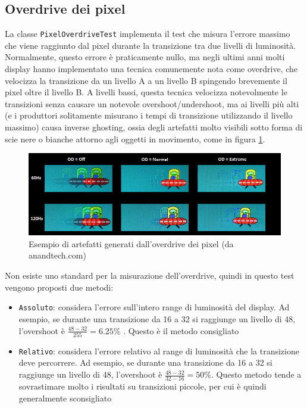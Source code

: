 \subsection{Overdrive dei pixel}
La classe \texttt{PixelOverdriveTest} implementa il test che misura l'errore massimo che viene raggiunto dal pixel durante la transizione tra due livelli di luminosità. Normalmente, questo errore è praticamente nullo, ma negli ultimi anni molti display hanno implementato una tecnica comunemente nota come overdrive, che velocizza la transizione da un livello A a un livello B spingendo brevemente il pixel oltre il livello B. A livelli bassi, questa tecnica velocizza notevolmente le transizioni senza causare un notevole overshoot/undershoot, ma ai livelli più alti (e i produttori solitamente misurano i tempi di transizione utilizzando il livello massimo) causa inverse ghosting, ossia degli artefatti molto visibili sotto forma di scie nere o bianche attorno agli oggetti in movimento, come in figura \ref{fig:overdrive_ufotest}.
\begin{figure}[H]
	\centering
	\includegraphics[width=\textwidth]{Chapter04/res/overdrive_ufotest.png}
	\caption{Esempio di artefatti generati dall'overdrive dei pixel (da anandtech.com)}
	\label{fig:overdrive_ufotest}
\end{figure}

Non esiste uno standard per la misurazione dell'overdrive, quindi in questo test vengono proposti due metodi:\begin{itemize}
	\item \texttt{Assoluto}: considera l'errore sull'intero range di luminosità del display. Ad esempio, se durante una transizione da 16 a 32 si raggiunge un livello di 48, l'overshoot è $\frac{48-32}{255}=6.25\%$ . Questo è il metodo consigliato
	\item \texttt{Relativo}: considera l'errore relativo al range di luminosità che la transizione deve percorrere. Ad esempio, se durante una transizione da 16 a 32 si raggiunge un livello di 48, l'overshoot è  $\frac{48-32}{32-16}=50\%$. Questo metodo tende a sovrastimare molto i risultati su transizioni piccole, per cui è quindi generalmente sconsigliato
\end{itemize}

